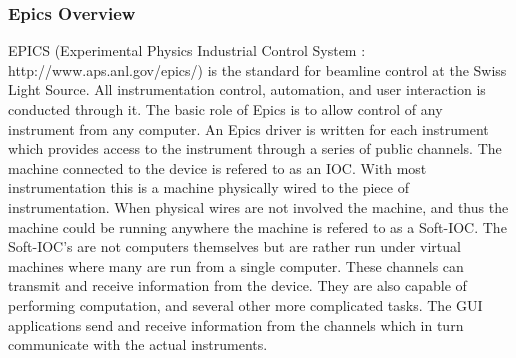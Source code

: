 \subsubsection*{Epics Overview}
EPICS (Experimental Physics Industrial Control System : http://www.aps.anl.gov/epics/) is the standard for beamline control at the Swiss Light Source. All instrumentation control, automation, and user interaction is conducted through it. The basic role of Epics is to allow control of any instrument from any computer. An Epics driver is written for each instrument which provides access to the instrument through a series of public channels. The machine connected to the device is refered to as an IOC. With most instrumentation this is a machine physically wired to the piece of instrumentation. When physical wires are not involved the machine, and thus the machine could be running anywhere the machine is refered to as a Soft-IOC. The Soft-IOC's are not computers themselves but are rather run under virtual machines where many are run from a single computer. These channels can transmit and receive information from the device. They are also capable of performing computation, and several other more complicated tasks. The GUI applications send and receive information from the channels which in turn communicate with the actual instruments. 

